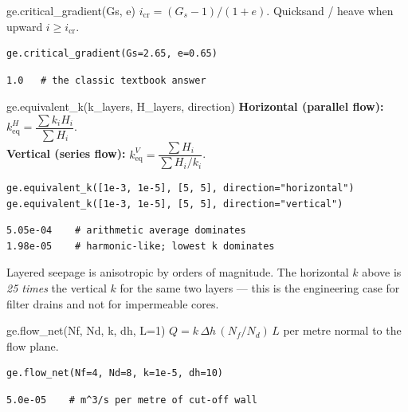 \documentclass[11pt,a4paper,openany]{book}
\begin{document}
\begin{funcbox}{ge.critical\_gradient(Gs, e)}
$i_{\text{cr}} = (G_s - 1)/(1 + e)$. Quicksand / heave when upward
$i \geq i_{\text{cr}}$.
\end{funcbox}

\begin{lstlisting}
ge.critical_gradient(Gs=2.65, e=0.65)
\end{lstlisting}
\begin{lstlisting}[style=output]
1.0   # the classic textbook answer
\end{lstlisting}

\begin{funcbox}{ge.equivalent\_k(k\_layers, H\_layers, direction)}
\textbf{Horizontal (parallel flow):}
$k_{\text{eq}}^{H} = \dfrac{\sum k_i H_i}{\sum H_i}$.\\
\textbf{Vertical (series flow):}
$k_{\text{eq}}^{V} = \dfrac{\sum H_i}{\sum H_i / k_i}$.
\end{funcbox}

\begin{lstlisting}
ge.equivalent_k([1e-3, 1e-5], [5, 5], direction="horizontal")
ge.equivalent_k([1e-3, 1e-5], [5, 5], direction="vertical")
\end{lstlisting}
\begin{lstlisting}[style=output]
5.05e-04    # arithmetic average dominates
1.98e-05    # harmonic-like; lowest k dominates
\end{lstlisting}

\begin{warnbox}
Layered seepage is anisotropic by orders of magnitude. The
horizontal $k$ above is \emph{25 times} the vertical $k$ for the
same two layers --- this is the engineering case for filter
drains and not for impermeable cores.
\end{warnbox}

\begin{funcbox}{ge.flow\_net(Nf, Nd, k, dh, L=1)}
$Q = k\,\Delta h\,(N_f/N_d)\,L$ per metre normal to the flow plane.
\end{funcbox}

\begin{lstlisting}
ge.flow_net(Nf=4, Nd=8, k=1e-5, dh=10)
\end{lstlisting}
\begin{lstlisting}[style=output]
5.0e-05    # m^3/s per metre of cut-off wall
\end{lstlisting}

\end{document}
